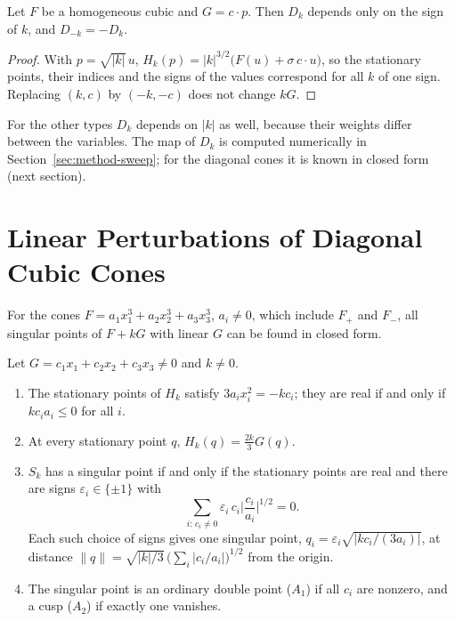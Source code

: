 \begin{proposition}
\label{prop:directions}
Let $F$ be a homogeneous cubic and $G=c\cdot p$. Then $D_k$ depends only on
the sign of $k$, and $D_{-k}=-D_k$.
\end{proposition}

\begin{proof}
With $p=\sqrt{|k|}\,u$, $H_k(p)=|k|^{3/2}\big(F(u)+\sigma\,c\cdot u\big)$, so
the stationary points, their indices and the signs of the values correspond
for all $k$ of one sign. Replacing $(k,c)$ by $(-k,-c)$ does not change $kG$.
\end{proof}

For the other types $D_k$ depends on $|k|$ as well, because their weights
differ between the variables. The map of $D_k$ is computed numerically in
Section~\ref{sec:method-sweep}; for the diagonal cones it is known in closed
form (next section).

\section{Linear Perturbations of Diagonal Cubic Cones}
\label{sec:linear}

For the cones $F=a_1x_1^3+a_2x_2^3+a_3x_3^3$, $a_i\neq0$, which include $F_+$
and $F_-$, all singular points of $F+kG$ with linear $G$ can be found in closed
form.

\begin{proposition}
\label{prop:linear}
Let $G=c_1x_1+c_2x_2+c_3x_3\neq0$ and $k\neq0$.
\begin{enumerate}
    \item The stationary points of $H_k$ satisfy $3a_ix_i^2=-kc_i$; they are
          real if and only if $kc_ia_i\le0$ for all $i$.
    \item At every stationary point $q$, $H_k(q)=\frac{2k}{3}G(q)$.
    \item $S_k$ has a singular point if and only if the stationary points are
          real and there are signs $\varepsilon_i\in\{\pm1\}$ with
          \begin{equation}
          \label{eq:balance}
          \sum_{i:\,c_i\neq0}\varepsilon_i\,c_i\Big|\frac{c_i}{a_i}\Big|^{1/2}=0 .
          \end{equation}
          Each such choice of signs gives one singular point,
          $q_i=\varepsilon_i\sqrt{|kc_i/(3a_i)|}$, at distance
          $\|q\|=\sqrt{|k|/3}\,\big(\sum_i|c_i/a_i|\big)^{1/2}$ from the origin.
    \item The singular point is an ordinary double point ($A_1$) if all $c_i$
          are nonzero, and a cusp ($A_2$) if exactly one vanishes.
\end{enumerate}
\end{proposition}


